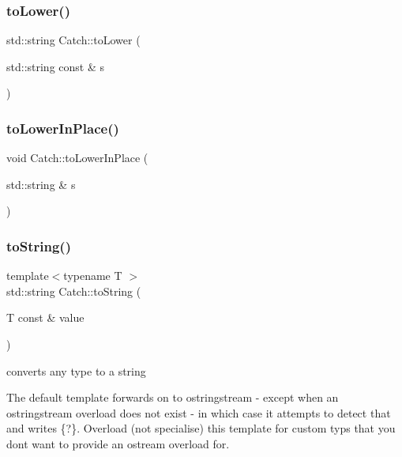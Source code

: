 \subsubsection{\texorpdfstring{to\+Lower()}{toLower()}}
{\footnotesize\ttfamily std\+::string Catch\+::to\+Lower (\begin{DoxyParamCaption}\item[{std\+::string const \&}]{s }\end{DoxyParamCaption})}

\mbox{\label{namespace_catch_a0760dbe87d090a55a35414db57d272c4}} 
\subsubsection{\texorpdfstring{to\+Lower\+In\+Place()}{toLowerInPlace()}}
{\footnotesize\ttfamily void Catch\+::to\+Lower\+In\+Place (\begin{DoxyParamCaption}\item[{std\+::string \&}]{s }\end{DoxyParamCaption})}

\mbox{\label{namespace_catch_adbd1730f961da94d9ed284f70fd7a28b}} 
\subsubsection{\texorpdfstring{to\+String()}{toString()}\hspace{0.1cm}{\footnotesize\ttfamily [1/17]}}
{\footnotesize\ttfamily template$<$typename T $>$ \\
std\+::string Catch\+::to\+String (\begin{DoxyParamCaption}\item[{T const \&}]{value }\end{DoxyParamCaption})}



converts any type to a string 

The default template forwards on to ostringstream -\/ except when an ostringstream overload does not exist -\/ in which case it attempts to detect that and writes \{?\}. Overload (not specialise) this template for custom typs that you don\textquotesingle{}t want to provide an ostream overload for. \mbox{\label{namespace_catch_ad6e969257437cf007b8b5017b22e570c}} 
